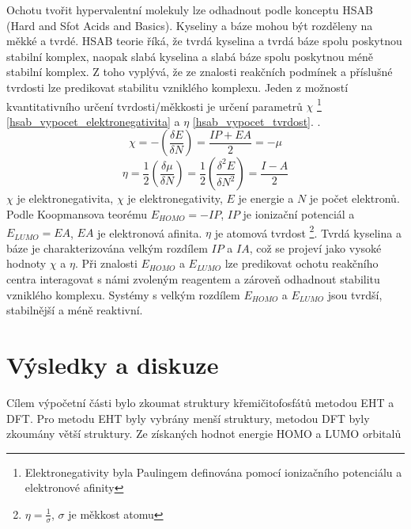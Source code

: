 \documentclass[
  digital, %
  table,   %
  lof,     %
  lot,     %
]{fithesis3}
\begin{document}
Ochotu tvořit hypervalentní molekuly lze odhadnout podle konceptu HSAB (Hard and Sfot Acids and Basics). Kyseliny a báze mohou být rozděleny na měkké a tvrdé. HSAB teorie říká, že tvrdá kyselina a tvrdá báze spolu poskytnou stabilní komplex, naopak slabá kyselina a slabá báze spolu poskytnou méně stabilní komplex. Z toho vyplývá, že ze znalosti reakčních podmínek a příslušné tvrdosti lze predikovat stabilitu vzniklého komplexu. Jeden z možností kvantitativního určení tvrdosti/měkkosti je určení parametrů $\chi$ \footnote{Elektronegativity byla Paulingem definována pomocí ionizačního potenciálu a elektronové afinity} \ref{hsab_vypocet_elektronegativita} a $\eta$ \ref{hsab_vypocet_tvrdost}. \cite{hsabclanek}. 
\begin{equation}
\chi = - \left( \frac{\delta E}{\delta N} \right) = \frac{IP + EA}{2} = -\mu
\label{hsab_vypocet_elektronegativita}
\end{equation} 
\begin{equation}
\eta = \frac{1}{2} \left( \frac{\delta \mu}{\delta N} \right) = \frac{1}{2}\left( \frac{\delta^2 E}{\delta N^2} \right) = \frac{I - A}{2}
\label{hsab_vypocet_tvrdost}
\end{equation} 
$\chi$ je elektronegativita, $\chi$ je elektronegativity, $E$ je energie a $N$ je počet elektronů. \cite{hsabwatoc} Podle Koopmansova teorému $E_{HOMO} = - IP$, $IP$ je ionizační potenciál a $E_{LUMO} = EA$, $EA$ je elektronová afinita.\cite{kratochvilexcerpta} $\eta$ je atomová tvrdost \footnote{$\eta = \frac{1}{\sigma}$, $\sigma$ je měkkost atomu}. \cite{hsabwatoc} Tvrdá kyselina a báze je charakterizována velkým rozdílem $IP$ a $IA$, což se projeví jako vysoké hodnoty $\chi$ a $\eta$. Při znalosti $E_{HOMO}$ a $E_{LUMO}$ lze predikovat ochotu reakčního centra interagovat s námi zvoleným reagentem a zároveň odhadnout stabilitu vzniklého komplexu. Systémy s velkým rozdílem $E_{HOMO}$ a $E_{LUMO}$ jsou tvrdší, stabilnější a méně reaktivní.




\chapter{Výsledky a diskuze}
Cílem výpočetní části bylo zkoumat struktury křemičitofosfátů metodou EHT a DFT. Pro metodu EHT byly vybrány menší struktury, metodou DFT byly zkoumány větší struktury. Ze získaných hodnot energie HOMO a LUMO orbitalů 
\end{document}
